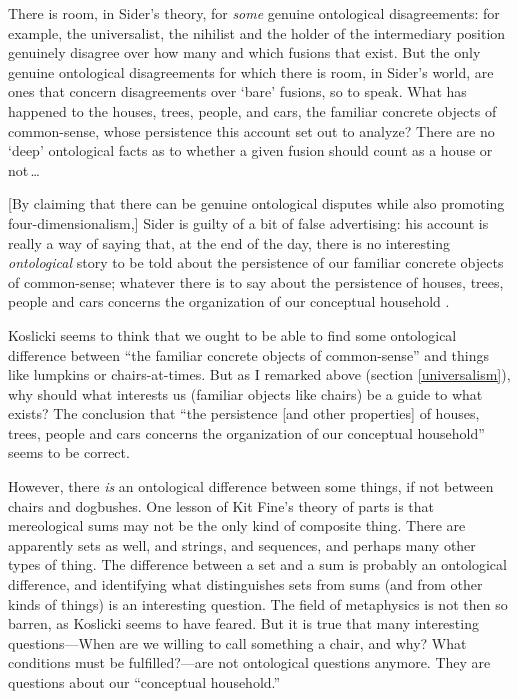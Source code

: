 \documentclass[11pt]{article}
\newenvironment{squote}{%
\begin{spacing}{1}
\begin{list}{}{%
\setlength{\labelwidth}{0pt}%
\rightmargin\leftmargin%
}
\item\relax
}{%
\end{list}%
\end{spacing}
}
\begin{document}
\begin{spacing}{1.5}
\begin{squote}
There is room, in Sider's theory, for {\em some} genuine ontological
disagreements: for example, the universalist, the nihilist and the
holder of the intermediary position genuinely disagree over how many
and which fusions that exist.  But the only genuine ontological
disagreements for which there is room, in Sider's world, are ones that
concern disagreements over `bare' fusions, so to speak.  What has
happened to the houses, trees, people, and cars, the familiar concrete
objects of common-sense, whose persistence this account set out to
analyze?  There are no `deep' ontological facts as to whether a given
fusion should count as a house or not\,\ldots

[By claiming that there can be genuine ontological disputes while also
  promoting four-dimensionalism,] Sider is guilty of a bit of false
advertising: his account is really a way of saying that, at the end of
the day, there is no interesting {\em ontological} story to be told
about the persistence of our familiar concrete objects of
common-sense; whatever there is to say about the persistence of
houses, trees, people and cars concerns the organization of our
conceptual household \citeyearpar[124--125]{koslicki2003}.
\end{squote}

Koslicki seems to think that we ought to be able to find some
ontological difference between ``the familiar concrete objects of
common-sense'' and things like lumpkins or chairs-at-times.  But as I
remarked above (section \ref{universalism}), why should what interests
us (familiar objects like chairs) be a guide to what exists?  The
conclusion that ``the persistence [and other properties] of houses,
trees, people and cars concerns the organization of our conceptual
household'' seems to be correct.

However, there {\em is} an ontological difference between some things,
if not between chairs and dogbushes.  One lesson of Kit Fine's theory
of parts is that mereological sums may not be the only kind of
composite thing.  There are apparently sets as well, and strings, and
sequences, and perhaps many other types of thing.  The difference
between a set and a sum is probably an ontological difference, and
identifying what distinguishes sets from sums (and from other kinds of
things) is an interesting question.  The field of metaphysics is not
then so barren, as Koslicki seems to have feared.  But it is true that
many interesting questions---When are we willing to call something a
chair, and why?  What conditions must be fulfilled?---are not
ontological questions anymore.  They are questions about our
``conceptual household.''

\ifstandalone
\end{spacing}


\fi
\end{document}

